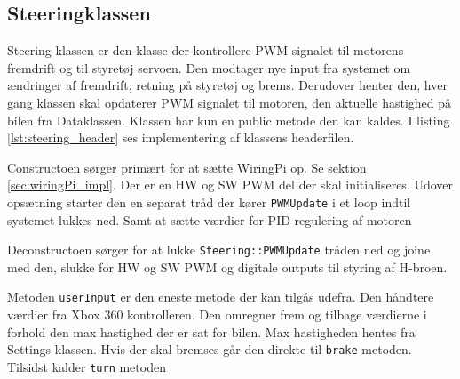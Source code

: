 \subsection{Steeringklassen} \label{sec:steering_impl}

Steering klassen er den klasse der kontrollere PWM signalet til motorens fremdrift og til styretøj servoen. 
Den modtager nye input fra systemet om ændringer af fremdrift, retning på styretøj og brems. Derudover henter den, hver gang klassen skal opdaterer PWM signalet til motoren, den aktuelle hastighed på bilen fra Dataklassen. 
Klassen har kun en public metode den kan kaldes. I listing \ref{lst:steering_header} ses implementering af klassens headerfilen.\newline



Constructoen sørger primært for at sætte WiringPi op. Se sektion \ref{sec:wiringPi_impl}. 
Der er en HW og SW PWM del der skal initialiseres. 
Udover opsætning starter den en separat tråd der kører \texttt{PWMUpdate} i et loop indtil systemet lukkes ned. 
Samt at sætte værdier for PID regulering af motoren 




Deconstructoen sørger for at lukke \texttt{Steering::PWMUpdate} tråden ned og joine med den, slukke for HW og SW PWM og digitale outputs til styring af H-broen.



Metoden \texttt{userInput} er den eneste metode der kan tilgås udefra. Den håndtere værdier fra Xbox 360 kontrolleren. Den omregner frem og tilbage værdierne i forhold den max hastighed der er sat for bilen. Max hastigheden hentes fra Settings klassen. Hvis der skal bremses går den direkte til \texttt{brake} metoden. Tilsidst kalder \texttt{turn} metoden

 

